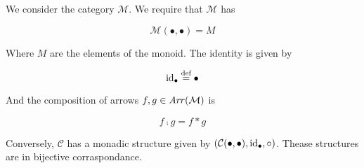 We consider the category $\mathcal M$. We require that $\mathcal M$ has

\begin{equation*}
\mathcal{M}(\bullet, \bullet) = M
\end{equation*}

Where $M$ are the elements of the monoid. The identity is given by

\begin{equation*}
\mathrm{id}_{ \bullet } \stackrel{\text{def}}{=} \bullet
\end{equation*}

And the composition of arrows $f, g \in \operatorname{\mathit{Arr}}(\mathcal M)$ is

\begin{equation*}
f \comp g = f \ast g
\end{equation*}

Conversely, $\mathcal C$ has a monadic structure given by
$(\mathcal{C}(\bullet, \bullet), \mathrm{id}_{ \bullet }, \circ)$. Thease structures
are in bijective corraspondance.

